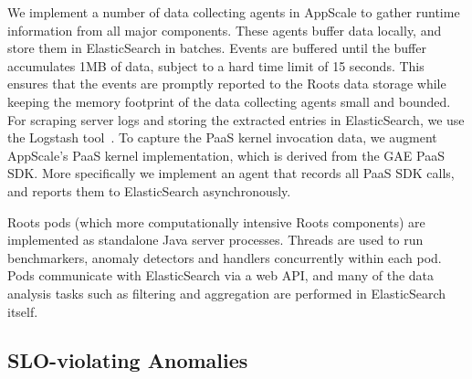 We implement a number of data collecting agents in AppScale to gather runtime information
from all major components. These agents buffer data locally, and store them in ElasticSearch
in batches. Events are buffered until the buffer accumulates 1MB of data, subject to a hard time limit of 
15 seconds. This ensures that the events are promptly reported to the Roots data
storage while keeping the memory footprint of the data collecting agents small and bounded. 
For scraping server logs and storing the extracted entries in ElasticSearch,
we use the Logstash tool~\cite{logstash}. 
To capture the PaaS kernel invocation data, we augment AppScale's PaaS kernel implementation,
which is derived from the GAE PaaS SDK. More specifically we implement an agent that records
all PaaS SDK calls, and reports them to ElasticSearch asynchronously. 

Roots pods (which more computationally intensive Roots components) are implemented as standalone Java server processes. 
Threads are used to run benchmarkers,
anomaly detectors and handlers concurrently within each pod. Pods communicate with ElasticSearch via
a web API, and many of the data analysis tasks such as filtering and aggregation are performed
in ElasticSearch itself. 

\subsection{SLO-violating Anomalies}

